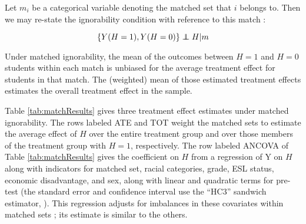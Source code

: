\documentclass{article}
\newenvironment{ass}[2][Assumption:]{\begin{trivlist}
\item[\hskip \labelsep {\bfseries #1}\hskip \labelsep {\bfseries #2}.]}{\end{trivlist}}
\def\independenT#1#2{\mathrel{\rlap{$#1#2$}\mkern2mu{#1#2}}}
\newcommand\independent{\protect\mathpalette{\protect\independenT}{\perp}}
\begin{document}
Let $m_i$ be a categorical variable denoting the matched set that $i$
belongs to.
Then we may re-state the ignorability condition with reference to this
match \citep[c.f.][]{rebar}:
\begin{ass}{Matched Ignorability}
\begin{equation*}
 \{Y(H=1),Y(H=0)\}\independent H |m
\end{equation*}
\end{ass}
Under matched ignorability, the mean of the outcomes between $H=1$ and
$H=0$ students within each match is unbiased for the average treatment
effect for students in that match.
The (weighted) mean of those estimated treatment effects estimates the
overall treatment effect in the sample.

Table \ref{tab:matchResults} gives three treatment effect estimates
under matched ignorability.
The rows labeled ATE and TOT weight the matched sets to
estimate the average effect of $H$ over the entire treatment
group and over those members of the treatment group with $H=1$,
respectively.
The row labeled ANCOVA of Table \ref{tab:matchResults} gives the
coefficient on $H$ from a regression of Y on $H$ along with indicators for matched set,
racial categories, grade, ESL status, economic disadvantage, and sex,
along with linear and quadratic terms for pre-test (the standard error
and confidence interval use the ``HC3'' sandwich estimator,
\citealt{sandwichPackage}).
This regression adjusts for imbalances in these covariates within
matched sets \citep[c.f.][]{biasAdjust}; its estimate is similar to
the others.
\end{document}
